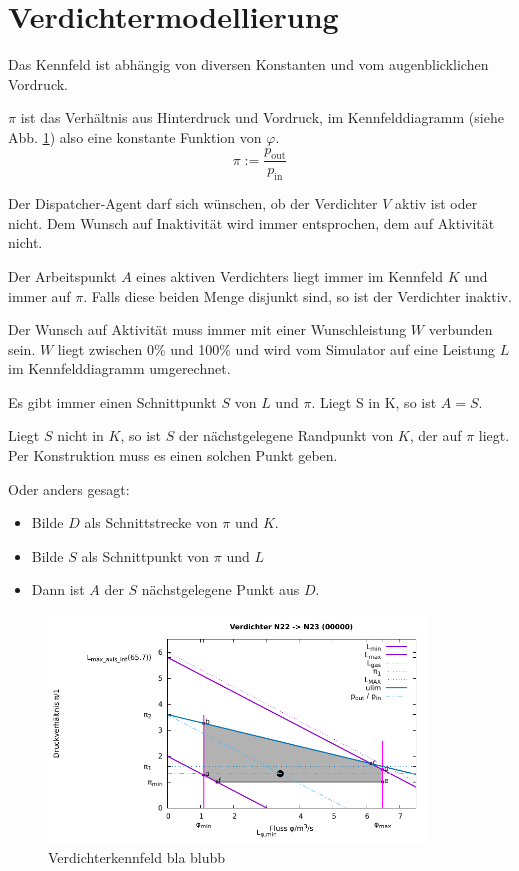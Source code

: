 \documentclass{article}
\begin{document}
\section*{Verdichtermodellierung}
Das Kennfeld ist abhängig von diversen Konstanten und vom
augenblicklichen Vordruck.

$\pi$ ist das Verhältnis aus Hinterdruck und Vordruck, im Kennfelddiagramm (siehe Abb. \ref{fig:kf})
also eine konstante Funktion von $\varphi$.
\begin{equation}
\pi:=\frac{p_{\text{out}}}{p_{\text{in}}}
\label{eq:pi}
\end{equation}

Der Dispatcher-Agent darf sich wünschen, ob der Verdichter $V$ aktiv ist
oder nicht. Dem Wunsch auf Inaktivität wird immer entsprochen, dem auf
Aktivität nicht.

Der Arbeitspunkt $A$ eines aktiven Verdichters liegt immer im Kennfeld $K$
und immer auf $\pi$. Falls diese beiden Menge disjunkt sind, so ist der
Verdichter inaktiv.

Der Wunsch auf Aktivität muss immer mit einer Wunschleistung $W$ verbunden
sein. $W$ liegt zwischen 0\% und 100\% und wird vom Simulator auf eine
Leistung $L$ im Kennfelddiagramm umgerechnet.

Es gibt immer einen Schnittpunkt $S$ von $L$ und $\pi$. Liegt S in K, so ist $A = S$.

Liegt $S$ nicht in $K$, so ist $S$ der nächstgelegene Randpunkt von $K$, der auf
$\pi$ liegt. Per Konstruktion muss es einen solchen Punkt geben.

Oder anders gesagt:
\begin{itemize}
\item Bilde $D$ als Schnittstrecke von $\pi$ und $K$.
\item Bilde $S$ als Schnittpunkt von $\pi$ und $L$
\item Dann ist $A$ der $S$ nächstgelegene Punkt aus $D$.
\end{itemize}

\begin{figure}[!ht]
\includegraphics[width=0.9\textwidth]{Example_Compressor_Wheel_Map.pdf}
\caption{Verdichterkennfeld bla blubb}
\label{fig:kf}
\end{figure}
\end{document}
